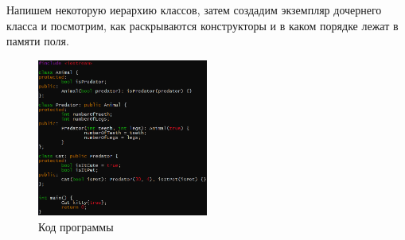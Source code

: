 \documentclass[a4paper,12pt]{article}
\begin{document}
Напишем некоторую иерархию классов, затем создадим экземпляр дочернего класса и посмотрим, как раскрываются конструкторы и в каком порядке лежат в памяти поля. 
\begin{figure}[H]\label{fig: Наследование код}
    \centering
    \includegraphics[width = 0.5\textwidth]{Наследование код.png}
    \caption{Код программы}
\end{figure}
\end{document}
